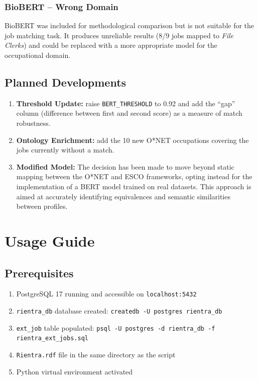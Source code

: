 \documentclass[12pt, a4paper]{report}
\begin{document}
\subsection{BioBERT -- Wrong Domain}

BioBERT was included for methodological comparison but is not suitable
for the job matching task. It produces unreliable results (8/9 jobs
mapped to \textit{File Clerks}) and could be replaced with a
more appropriate model for the occupational domain.

\section{Planned Developments}

\begin{enumerate}
  \item \textbf{Threshold Update:} raise
        \texttt{BERT\_THRESHOLD} to 0.92 and add the ``gap'' column
        (difference between first and second score) as a measure of
        match robustness.
  \item \textbf{Ontology Enrichment:} add the 10 new
        O*NET occupations covering the jobs currently without a match.

  \item \textbf{Modified Model:} The decision has been made to move beyond static mapping between the O*NET and ESCO frameworks, opting instead for the implementation of a BERT model trained on real datasets. This approach is aimed at accurately identifying equivalences and semantic similarities between profiles.
\end{enumerate}

% 
\chapter{Usage Guide}
% 

\section{Prerequisites}

\begin{enumerate}
  \item PostgreSQL 17 running and accessible on \texttt{localhost:5432}
  \item \texttt{rientra\_db} database created:
        \lstinline|createdb -U postgres rientra_db|
  \item \texttt{ext\_job} table populated:
        \lstinline|psql -U postgres -d rientra_db -f rientra_ext_jobs.sql|
  \item \texttt{Rientra.rdf} file in the same directory as the script
  \item Python virtual environment activated
\end{enumerate}
\end{document}
